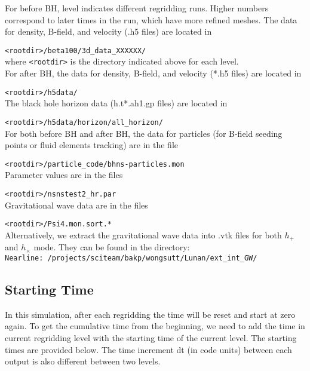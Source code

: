 \documentclass{article}
\begin{document}
For before BH, level indicates different regridding runs. Higher numbers correspond to later times in the run, which have more refined meshes. The data for density, B-field, and velocity (.h5 files) are located in
	
	\verb|<rootdir>/beta100/3d_data_XXXXXX/|   \\
where \verb|<rootdir>| is the directory indicated above for each level. \\

For after BH, the data for density, B-field, and velocity (*.h5 files) are located in 
	
	\verb|<rootdir>/h5data/| \\
The black hole horizon data (h.t*.ah1.gp files) are located in
	
	\verb|<rootdir>/h5data/horizon/all_horizon/| \\
	
For both before BH and after BH, the data for particles (for B-field seeding points or fluid elements tracking) are in the file 
	
	\verb|<rootdir>/particle_code/bhns-particles.mon| \\
Parameter values are in the files

	\verb|<rootdir>/nsnstest2_hr.par| \\ 
Gravitational wave data are in the files

	\verb|<rootdir>/Psi4.mon.sort.*| \\ 
Alternatively, we extract the gravitational wave data into .vtk files for both $h_+$ and $h_\times$ mode. They can be found in the directory: \\
	\verb|Nearline: /projects/sciteam/bakp/wongsutt/Lunan/ext_int_GW/| \\

\subsection{Starting Time}

In this simulation, after each regridding the time will be reset and start at zero again. To get the cumulative time from the beginning, we need to add the time in current regridding level with the starting time of the current level. The starting times are provided below. The time increment dt (in code units) between each output is also different between two levels.
\\
\\
\end{document}
